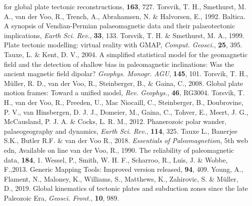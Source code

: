 \begin{thebibliography}{}
  for global plate tectonic reconstructions, \gji{}\textbf{163},
  727.
  Torsvik, T. H., Smethurst, M. A., van der Voo, R., Trench, A., Abrahamsen, N.
  \& Halvorsen, E., 1992. Baltica. A synopsis of Vendian-Permian palaeomagnetic
  data and their palaeotectonic implications, \textit{Earth Sci. Rev.},
  \textbf{33}, 133.
  Torsvik, T. H. \& Smethurst, M. A., 1999. Plate tectonic modelling: virtual
  reality with GMAP, \textit{Comput. Geosci.}, \textbf{25}, 395.
  Tauxe, L. \& Kent, D. V., 2004. A simplified statistical model for the
  geomagnetic field and the detection of shallow bias in paleomagnetic
  inclinations: Was the ancient magnetic field dipolar? \textit{Geophys.
  Monogr. AGU}, \textbf{145}, 101.
  Torsvik, T. H., M{\"{u}}ller, R. D., van der Voo, R., Steinberger, B., \&
  Gaina, C., 2008. Global plate motion frames: Toward a unified model,
  \textit{Rev. Geophys.}, \textbf{46}, RG3004.
  Torsvik, T. H., van der Voo, R., Preeden, U., Mac Niocaill, C., Steinberger,
  B., Doubrovine, P. V., van Hinsbergen, D. J. J., Domeier, M., Gaina, C.,
  Tohver, E., Meert, J. G., McCausland, P. J. A. \& Cocks, L. R. M., 2012.
  Phanerozoic polar wander, palaeogeography and dynamics, \textit{Earth Sci.
  Rev.}, \textbf{114}, 325.
  Tauxe L., Banerjee S.K., Butler R.F. \& van der Voo R., 2018.
  \textit{Essentials of Paleomagnetism}, 5th web edn, Available on line
  van der Voo, R., 1990. The reliability of paleomagnetic data,
  \tecto{}\textbf{184}, 1.
  Wessel, P., Smith, W. H. F., Scharroo, R., Luis, J. \& Wobbe, F.,2013. Generic
  Mapping Tools: Improved version released, \eos{}\textbf{94}, 409.
  Young, A., Flament, N., Maloney, K., Williams, S., Matthews, K., Zahirovic, S.
  \& M{\"{u}}ller, D., 2019. Global kinematics of tectonic plates and subduction
  zones since the late Paleozoic Era, \textit{Geosci. Front.},
  \textbf{10}, 989.
\end{thebibliography}~\label{lastpage}
